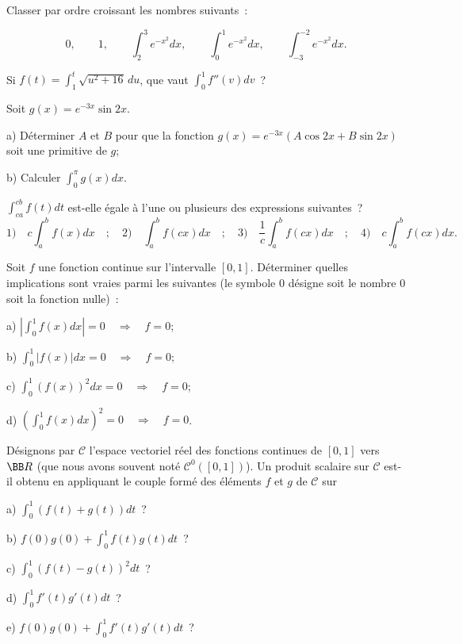 \documentclass[12pt,french,oneside,a4paper]{memoir} %
\begin{document}
\begin{exo}
Classer par ordre croissant les nombres suivants~:

\begin{equation*}
0,\qquad 1,\qquad \displaystyle{\int^3_2e^{-x^2}dx},\qquad
\displaystyle{\int^1_0e^{-x^2}dx},\qquad 
\displaystyle{\int^{-2}_{-3}e^{-x^2}dx}.
\end{equation*}
\end{exo}
\begin{exo}
Si $\displaystyle{f(t)=\int^t_1\sqrt{u^2+16}\,du}$, que vaut
$\displaystyle{\int^1_0 f''(v)dv}$~?
\end{exo}
\begin{exo}
Soit $\displaystyle{g(x)=e^{-3x}\sin 2x}$.

a) Déterminer $A$ et $B$ pour que la fonction 
$\displaystyle{g(x)=e^{-3x}(A\cos 2x+B\sin 2x)}$ soit une primitive
de $g$;

b) Calculer $\displaystyle{\int^\pi_0g(x)dx}$.
\end{exo}
\begin{exo}
$\displaystyle{\int^{cb}_{ca}f(t)dt}$ est-elle égale à
l'une ou plusieurs des expressions suivantes~?
\begin{equation*}
1)\quad c\int^b_a f(x)dx\quad;\quad 
2)\quad \int^b_af(cx)dx\quad;\quad 
3)\quad \frac{1}{c}\int^b_af(cx)dx\quad;\quad
4)\quad c\int^b_af(cx)dx.
\end{equation*}
\end{exo}
\begin{exo}
Soit $f$ une fonction continue sur l'intervalle $[0,1]$.
Déterminer quelles implications sont vraies parmi les suivantes
(le symbole 0 désigne soit le nombre 0 soit la fonction nulle)~:

a)
$\displaystyle{\left|\int^1_0f(x)dx\right|=0\quad\Rightarrow\quad 
f=0}$;

b) $\displaystyle{\int^1_0|f(x)|dx=0\quad\Rightarrow\quad f=0}$;

c) $\displaystyle{\int^1_0(f(x))^2dx=0\quad\Rightarrow\quad f=0}$;

d) $\displaystyle{(\int^1_0f(x)dx)^2=0\quad\Rightarrow\quad f=0}$.
\end{exo}
\begin{exo}
Désignons par $\mathcal C$ l'espace vectoriel réel des
fonctions continues de $[0,1]$ vers ${\BB R}$ (que nous avons souvent
noté $\mathcal{C}^0([0,1])$). Un produit scalaire sur $\mathcal C$
est-il obtenu en appliquant le couple formé des éléments $f$ et
$g$ de $\mathcal C$ sur

a) $\displaystyle{\int^1_0(f(t)+g(t))dt}$~?

b) $\displaystyle{f(0)g(0)+\int^1_0f(t)g(t)dt}$~?

c) $\displaystyle{\int^1_0(f(t)-g(t))^2dt}$~?

d) $\displaystyle{\int^1_0f'(t)g'(t)dt}$~?

e) $\displaystyle{f(0)g(0)+\int^1_0f'(t)g'(t)dt}$~?
\end{exo}
\end{document}

